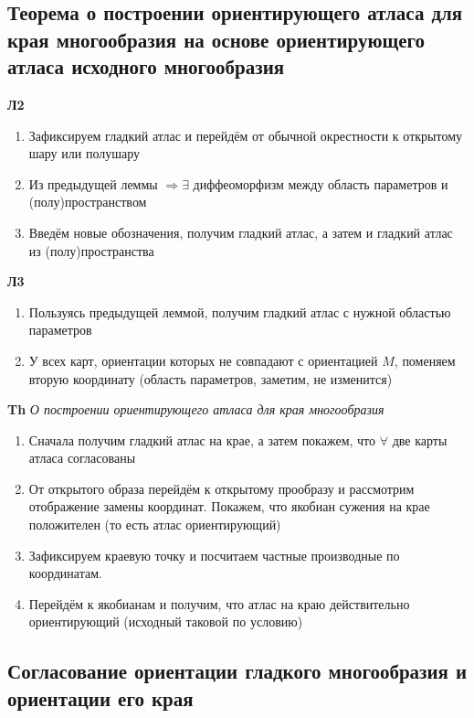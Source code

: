 \documentclass[a4paper, 14pt]{article}
\begin{document}
    \subsection{Теорема о построении ориентирующего атласа для края многообразия на основе ориентирующего атласа
    исходного многообразия}
    
    \textbf{Л2}
    
    \begin{enumerate}
        \item Зафиксируем гладкий атлас и перейдём от обычной окрестности к открытому шару или полушару
        \item Из предыдущей леммы $\Rightarrow \exists$ диффеоморфизм между область параметров и (полу)пространством
        \item Введём новые обозначения, получим гладкий атлас, а затем и гладкий атлас из (полу)пространства
    \end{enumerate}
    
    \textbf{Л3}
    
    \begin{enumerate}
        \item Пользуясь предыдущей леммой, получим гладкий атлас с нужной областью параметров
        \item У всех карт, ориентации которых не совпадают с ориентацией $M$, поменяем вторую координату (область
        параметров, заметим, не изменится)
    \end{enumerate}
    
    \textbf{Th} \textit{О построении ориентирующего атласа для края многообразия}
    
    \begin{enumerate}
        \item Сначала получим гладкий атлас на крае, а затем покажем, что $\forall$ две карты атласа согласованы
        \item От открытого образа перейдём к открытому прообразу и рассмотрим отображение замены координат.
        Покажем, что якобиан сужения на крае положителен (то есть атлас ориентирующий)
        \item Зафиксируем краевую точку и посчитаем частные производные по координатам.
        \item Перейдём к якобианам и получим, что атлас на краю действительно ориентирующий (исходный таковой по условию)
    \end{enumerate}
    
    \subsection{Согласование ориентации гладкого многообразия и ориентации его края}
    
\end{document}
